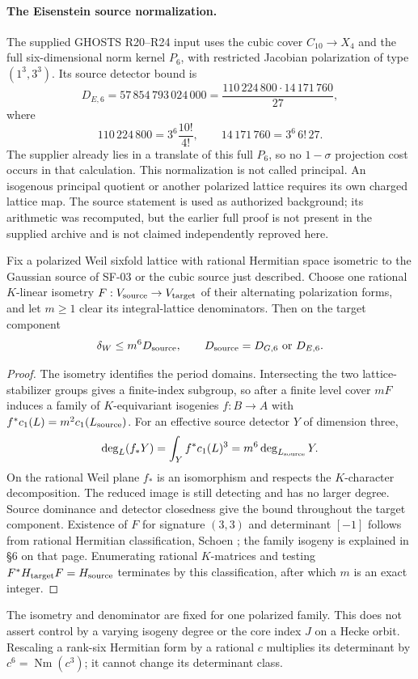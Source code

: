 \paragraph{The Eisenstein source normalization.}
The supplied GHOSTS R20--R24 input uses the cubic cover
$C_{10}\to X_4$ and the full six-dimensional norm kernel $P_6$,
with restricted Jacobian polarization of type $(1^3,3^3)$. Its source
detector bound is
\[
 D_{E,6}=57\,854\,793\,024\,000
 =\frac{110\,224\,800\cdot14\,171\,760}{27},
\]
where
\[
 110\,224\,800=3^6\frac{10!}{4!},\qquad
 14\,171\,760=3^6\,6!\,27.
\]
The supplier already lies in a translate of this full $P_6$, so no
$1-\sigma$ projection cost occurs in that calculation. This
normalization is not called principal. An isogenous principal
quotient or another polarized lattice requires its own charged
lattice map. The source statement is used as authorized background;
its arithmetic was recomputed, but the earlier full proof is not
present in the supplied archive and is not claimed independently
reproved here.

\begin{proposition}
\label{SF-04}
Fix a polarized Weil sixfold lattice with rational Hermitian space
isometric to the Gaussian source of SF-03 or the cubic source just
described. Choose one rational $K$-linear isometry
$F:V_{\rm source}\to V_{\rm target}$ of their alternating
polarization forms, and let $m\ge1$ clear its integral-lattice
denominators. Then on the target component
\[
 \delta_W\le m^6D_{\rm source},
 \qquad D_{\rm source}=D_{G,6}\ \hbox{or}\ D_{E,6}.
\]
\end{proposition}
\begin{proof}
The isometry identifies the period domains. Intersecting the two
lattice-stabilizer groups gives a finite-index subgroup, so after a
finite level cover $mF$ induces a family of $K$-equivariant
isogenies $f:B\to A$ with
$f^*c_1(L)=m^2c_1(L_{\rm source})$. For an effective source detector
$Y$ of dimension three,
\[
 \deg_L(f_*Y)=\int_Y f^*c_1(L)^3
 =m^6\deg_{L_{\rm source}}Y.
\]
On the rational Weil plane $f_*$ is an isomorphism and respects the
$K$-character decomposition. The reduced image is still detecting
and has no larger degree. Source dominance and detector closedness
give the bound throughout the target component. Existence of $F$
for signature $(3,3)$ and determinant $[-1]$ follows from rational
Hermitian classification, Schoen \cite[\S7, p.~332]{SF-Schoen1998};
the family isogeny is explained in \S6 on that page. Enumerating
rational $K$-matrices and testing $F^*H_{\rm target}F=H_{\rm source}$
terminates by this classification, after which $m$ is an exact
integer.
\end{proof}
The isometry and denominator are fixed for one polarized family.
This does not assert control by a varying isogeny degree or the core
index $J$ on a Hecke orbit. Rescaling a rank-six Hermitian form by a
rational $c$ multiplies its determinant by $c^6=\operatorname{Nm}(c^3)$;
it cannot change its determinant class.

